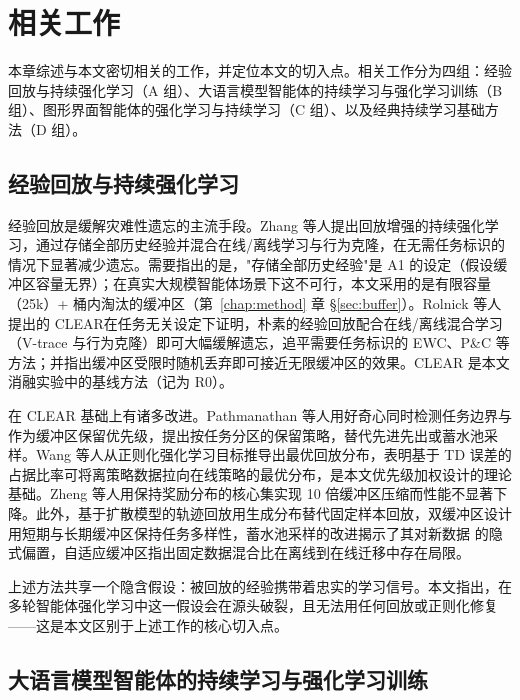 \chapter{相关工作}
\label{chap:related}

本章综述与本文密切相关的工作，并定位本文的切入点。相关工作分为四组：经验回放与持续强化学习（A 组）、大语言模型智能体的持续学习与强化学习训练（B 组）、图形界面智能体的强化学习与持续学习（C 组）、以及经典持续学习基础方法（D 组）。

\section{经验回放与持续强化学习}
\label{sec:rel-replay}

经验回放是缓解灾难性遗忘的主流手段。Zhang 等人提出回放增强的持续强化学习，通过存储全部历史经验并混合在线/离线学习与行为克隆，在无需任务标识的情况下显著减少遗忘。需要指出的是，"存储全部历史经验"是 A1 的设定（假设缓冲区容量无界）；在真实大规模智能体场景下这不可行，本文采用的是有限容量（25k）+ 桶内淘汰的缓冲区（第~\ref{chap:method} 章 \S\ref{sec:buffer}）。Rolnick 等人提出的 CLEAR在任务无关设定下证明，朴素的经验回放配合在线/离线混合学习（V-trace 与行为克隆）即可大幅缓解遗忘，追平需要任务标识的 EWC、P\&C 等方法；并指出缓冲区受限时随机丢弃即可接近无限缓冲区的效果。CLEAR 是本文消融实验中的基线方法（记为 R0）。

在 CLEAR 基础上有诸多改进。Pathmanathan 等人用好奇心同时检测任务边界与作为缓冲区保留优先级，提出按任务分区的保留策略，替代先进先出或蓄水池采样。Wang 等人从正则化强化学习目标推导出最优回放分布，表明基于 TD 误差的占据比率可将离策略数据拉向在线策略的最优分布，是本文优先级加权设计的理论基础。Zheng 等人用保持奖励分布的核心集实现 10 倍缓冲区压缩而性能不显著下降。此外，基于扩散模型的轨迹回放用生成分布替代固定样本回放，双缓冲区设计用短期与长期缓冲区保持任务多样性，蓄水池采样的改进揭示了其对新数据 的隐式偏置，自适应缓冲区指出固定数据混合比在离线到在线迁移中存在局限。

上述方法共享一个隐含假设：被回放的经验携带着忠实的学习信号。本文指出，在多轮智能体强化学习中这一假设会在源头破裂，且无法用任何回放或正则化修复——这是本文区别于上述工作的核心切入点。

\section{大语言模型智能体的持续学习与强化学习训练}
\label{sec:rel-llm}


